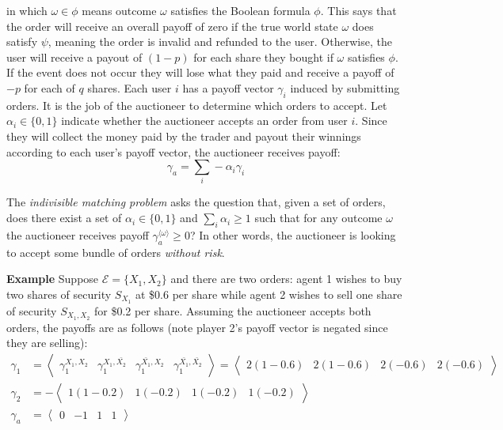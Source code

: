 in which $\omega \in \phi$ means outcome $\omega$ satisfies the Boolean formula
$\phi$. This says that the order will receive an overall payoff of zero if the
true world state $\omega$ does satisfy $\psi$, meaning the order is invalid and
refunded to the user. Otherwise, the user will receive a payout of $(1-p)$ for
each share they bought if $\omega$ satisfies $\phi$. If the event does not
occur they will lose what they paid and receive a payoff of $-p$ for each of
$q$ shares. Each user $i$ has a payoff vector $\gamma_i$ induced by submitting
orders. It is the job of the auctioneer to determine which orders to accept.
Let $\alpha_i \in \{0,1\}$ indicate whether the auctioneer accepts an order
from user $i$. Since they will collect the money paid by the trader and payout
their winnings according to each user's payoff vector, the auctioneer receives
payoff:
%
$$ \gamma_a = \sum_i -\alpha_i \gamma_i $$

The \emph{indivisible matching problem} asks the question that, given a set of
orders, does there exist a set of $\alpha_i \in \{0,1\}$ and $\sum_i \alpha_i
\ge 1$ such that for any outcome $\omega$ the auctioneer receives payoff
$\gamma_a^{\langle \omega \rangle} \ge 0$? In other words, the auctioneer is
looking to accept some bundle of orders \emph{without risk}.

\textbf{Example} Suppose $\mathcal{E} = \{X_1, X_2\}$ and there are two orders:
agent 1 wishes to buy two shares of security $S_{X_1}$ at \$0.6 per share while
agent 2 wishes to sell one share of security $S_{X_1,X_2}$ for \$0.2 per
share. Assuming the auctioneer accepts both orders, the payoffs are as follows
(note player 2's payoff vector is negated since they are selling):
%
\begin{equation*}
	\begin{aligned}
		\gamma_1 & = \left\langle \begin{matrix}
			\gamma_1^{X_1,X_2} &
			\gamma_1^{X_1,\bar{X_2}} &
			\gamma_1^{\bar{X_1},X_2} &
		\gamma_1^{\bar{X_1},\bar{X_2}} \end{matrix} \right\rangle 
%
		 = \left\langle \begin{matrix}
			2(1-0.6) & 2(1-0.6) & 2(-0.6) & 2(-0.6) \end{matrix} \right\rangle \\
%
		\gamma_2 & = - \left\langle \begin{matrix}
			1(1-0.2) & 1(-0.2) & 1(-0.2) & 1(-0.2) \end{matrix} \right\rangle \\
%
		\gamma_a & = \left\langle \begin{matrix}
			0 & -1 & 1 & 1 \end{matrix} \right\rangle
	\end{aligned}
\end{equation*}

